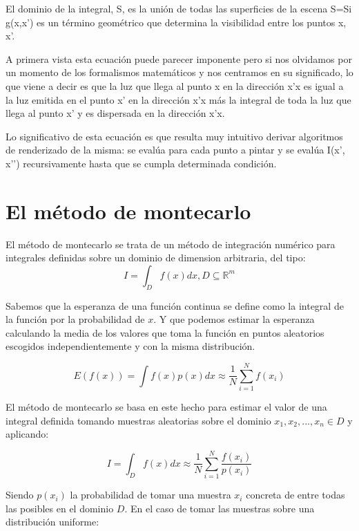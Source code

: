El dominio de la integral, S, es la unión de todas las superficies de la escena S=Si
g(x,x’) es un término geométrico que determina la visibilidad entre los puntos x, x’.

A primera vista esta ecuación puede parecer imponente pero si nos olvidamos por un momento de los formalismos matemáticos y nos centramos en su significado, lo que viene a decir es que la luz que llega al punto x en la dirección x'x es igual a la luz emitida en el punto x’ en la dirección x'x más la integral de toda la luz que llega al punto x’ y es dispersada en la dirección x'x.

Lo significativo de esta ecuación es que resulta muy intuitivo derivar algoritmos de renderizado de la misma: se evalúa para cada punto a pintar y se evalúa I(x’, x’’) recursivamente hasta que se cumpla determinada condición.

\clearpage

\section{El método de montecarlo}

El método de montecarlo se trata de un método de integración numérico para integrales definidas sobre un dominio de dimension arbitraria, del tipo:
\begin{equation}
I = \int_D f(x)dx , D \subseteq \mathbb{R}^m
\end{equation}

Sabemos que la esperanza de una función continua se define como la integral de la función por la probabilidad de $x$. Y que podemos estimar la esperanza calculando la media de los valores que toma la función en puntos aleatorios escogidos independientemente y con la misma distribución.

\begin{equation}
E(f(x)) = \int f(x)p(x)dx \approx \frac{1}{N} \sum _{i=1} ^N f(x_i) 
\end{equation}


El método de montecarlo se basa en este hecho para estimar el valor de una integral definida tomando muestras aleatorias sobre el dominio $x_1, x_2, ..., x_n \in D$ y aplicando:

\begin{equation}
\label{eq:montecarlo}
I = \int_D f(x)dx \approx \frac{1}{N} \sum _{i=1} ^N \frac{f(x_i)}{p(x_i)} 
\end{equation}

Siendo $p(x_i)$ la probabilidad de tomar una muestra $x_i$ concreta de entre todas las posibles en el dominio $D$. En el caso de tomar las muestras sobre una distribución uniforme:

